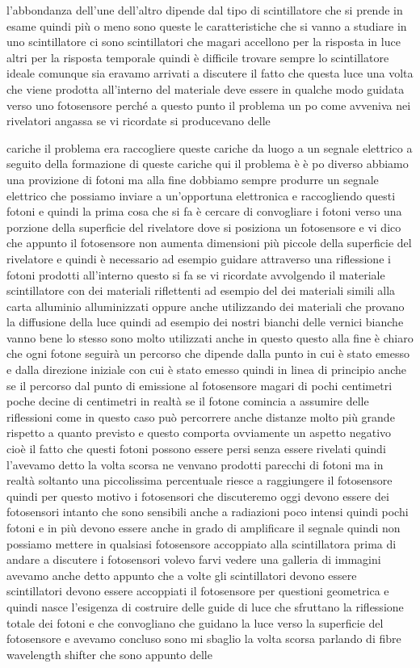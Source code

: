 {l'abbondanza dell'une dell'altro dipende dal tipo di scintillatore che si prende in esame quindi più o meno sono queste le caratteristiche che si vanno a studiare in uno scintillatore ci sono scintillatori che magari accellono per la risposta in luce altri per la risposta temporale quindi è difficile trovare sempre lo scintillatore ideale comunque sia eravamo arrivati a discutere il fatto che questa luce una volta che viene prodotta all'interno del materiale deve essere in qualche modo guidata verso uno fotosensore perché a questo punto il problema un po come avveniva nei rivelatori angassa se vi ricordate si producevano delle 

cariche il problema era raccogliere queste cariche da luogo a un segnale elettrico a seguito della formazione di queste cariche qui il problema è è po diverso abbiamo una provizione di fotoni ma alla fine dobbiamo sempre produrre un segnale elettrico che possiamo inviare a un'opportuna elettronica e raccogliendo questi fotoni e quindi la prima cosa che si fa è cercare di convogliare i fotoni verso una porzione della superficie del rivelatore dove si posiziona un fotosensore e vi dico che appunto il fotosensore non aumenta dimensioni più piccole della superficie del rivelatore e quindi è necessario ad esempio guidare attraverso una riflessione i fotoni prodotti all'interno questo si fa se vi ricordate avvolgendo il materiale scintillatore con dei materiali riflettenti ad esempio del dei materiali simili alla carta alluminio alluminizzati oppure anche utilizzando dei materiali che provano la diffusione della luce quindi ad esempio dei nostri bianchi delle vernici bianche vanno bene lo stesso sono molto utilizzati anche in questo questo alla fine è chiaro che ogni fotone seguirà un percorso che dipende dalla punto in cui è stato emesso e dalla direzione iniziale con cui è stato emesso quindi in linea di principio anche se il percorso dal punto di emissione al fotosensore magari di pochi centimetri poche decine di centimetri in realtà se il fotone comincia a assumire delle riflessioni come in questo caso può percorrere anche distanze molto più grande rispetto a quanto previsto e questo comporta ovviamente un aspetto negativo cioè il fatto che questi fotoni possono essere persi senza essere rivelati quindi l'avevamo detto la volta scorsa ne venvano prodotti parecchi di fotoni ma in realtà soltanto una piccolissima percentuale riesce a raggiungere il fotosensore quindi per questo motivo i fotosensori che discuteremo oggi devono essere dei fotosensori intanto che sono sensibili anche a radiazioni poco intensi quindi pochi fotoni e in più devono essere anche in grado di amplificare il segnale quindi non possiamo mettere in qualsiasi fotosensore accoppiato alla scintillatora prima di andare a discutere i fotosensori volevo farvi vedere una galleria di immagini avevamo anche detto appunto che a volte gli scintillatori devono essere scintillatori devono essere accoppiati il fotosensore per questioni geometrica e quindi nasce l'esigenza di costruire delle guide di luce che sfruttano la riflessione totale dei fotoni e che convogliano che guidano la luce verso la superficie del fotosensore e avevamo concluso sono mi sbaglio la volta scorsa parlando di fibre wavelength shifter che sono appunto delle }
